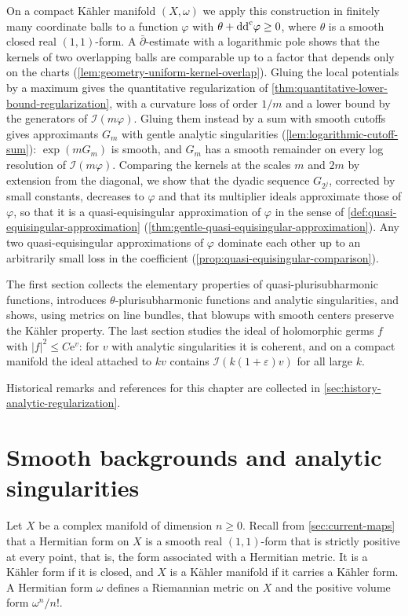 On a compact K\"ahler manifold $(X,\omega)$ we apply this construction in finitely many coordinate balls to a function $\varphi$ with $\theta+\mathrm{dd}^{\mathrm{c}}\varphi\geq0$, where $\theta$ is a smooth closed real $(1,1)$-form. A $\bar\partial$-estimate with a logarithmic pole shows that the kernels of two overlapping balls are comparable up to a factor that depends only on the charts (\cref{lem:geometry-uniform-kernel-overlap}). Gluing the local potentials by a maximum gives the quantitative regularization of \cref{thm:quantitative-lower-bound-regularization}, with a curvature loss of order $1/m$ and a lower bound by the generators of $\mathcal I(m\varphi)$. Gluing them instead by a sum with smooth cutoffs gives approximants $G_m$ with gentle analytic singularities (\cref{lem:logarithmic-cutoff-sum}): $\exp(mG_m)$ is smooth, and $G_m$ has a smooth remainder on every log resolution of $\mathcal I(m\varphi)$. Comparing the kernels at the scales $m$ and $2m$ by extension from the diagonal, we show that the dyadic sequence $G_{2^j}$, corrected by small constants, decreases to $\varphi$ and that its multiplier ideals approximate those of $\varphi$, so that it is a quasi-equisingular approximation of $\varphi$ in the sense of \cref{def:quasi-equisingular-approximation} (\cref{thm:gentle-quasi-equisingular-approximation}). Any two quasi-equisingular approximations of $\varphi$ dominate each other up to an arbitrarily small loss in the coefficient (\cref{prop:quasi-equisingular-comparison}).

The first section collects the elementary properties of quasi-plurisubharmonic functions, introduces $\theta$-plurisubharmonic functions and analytic singularities, and shows, using metrics on line bundles, that blowups with smooth centers preserve the K\"ahler property. The last section studies the ideal of holomorphic germs $f$ with $|f|^2\leq C\mathrm e^v$: for $v$ with analytic singularities it is coherent, and on a compact manifold the ideal attached to $kv$ contains $\mathcal I(k(1+\varepsilon)v)$ for all large $k$.

Historical remarks and references for this chapter are collected in \cref{sec:history-analytic-regularization}.

\section{Smooth backgrounds and analytic singularities}
\label{sec:analytic-singularity-definitions}

Let $X$ be a complex manifold of dimension $n\geq0$. Recall from \cref{sec:current-maps} that a Hermitian form on $X$ is a smooth real $(1,1)$-form that is strictly positive at every point, that is, the form associated with a Hermitian metric. It is a K\"ahler form if it is closed, and $X$ is a K\"ahler manifold if it carries a K\"ahler form. A Hermitian form $\omega$ defines a Riemannian metric on $X$ and the positive volume form $\omega^n/n!$.

